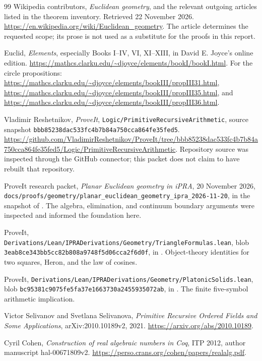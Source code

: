 \begin{thebibliography}{99}
 Wikipedia contributors, \emph{Euclidean geometry}, and the
relevant outgoing articles listed in the theorem inventory. Retrieved
22 November 2026. \url{https://en.wikipedia.org/wiki/Euclidean_geometry}.
The article determines the requested scope; its prose is not used as a
substitute for the proofs in this report.

 Euclid, \emph{Elements}, especially Books I--IV, VI,
XI--XIII, in David E. Joyce's online edition.
\url{https://mathcs.clarku.edu/~djoyce/elements/bookI/bookI.html}.
For the circle propositions:
\url{https://mathcs.clarku.edu/~djoyce/elements/bookIII/propIII31.html},
\url{https://mathcs.clarku.edu/~djoyce/elements/bookIII/propIII35.html}, and
\url{https://mathcs.clarku.edu/~djoyce/elements/bookIII/propIII36.html}.

 Vladimir Reshetnikov, \emph{ProveIt},
\texttt{Logic/PrimitiveRecursiveArithmetic}, source snapshot
\texttt{bbb85238dac533fc4b7b84a750cca864fe35fed5}.
\url{https://github.com/VladimirReshetnikov/ProveIt/tree/bbb85238dac533fc4b7b84a750cca864fe35fed5/Logic/PrimitiveRecursiveArithmetic}.
Repository source was inspected through the GitHub connector; this packet
does not claim to have rebuilt that repository.

 ProveIt research packet,
\emph{Planar Euclidean geometry in iPRA}, 20 November 2026,
\texttt{docs/proofs/geometry/planar\_euclidean\_geometry\_ipra\_2026-11-20},
in the snapshot of \cite{proveit}. The algebra, elimination, and continuum
boundary arguments were inspected and informed the foundation here.

 ProveIt,
\nolinkurl{Derivations/Lean/IPRADerivations/Geometry/TriangleFormulas.lean},
blob \texttt{3eab8ce343bb5cc82b808a9748f5d06cca2f6d0f},
in \cite{proveit}. Object-theory identities for two squares, Heron, and
the law of cosines.

 ProveIt,
\nolinkurl{Derivations/Lean/IPRADerivations/Geometry/PlatonicSolids.lean},
blob \texttt{bc95381c9075fe5fa37e1663730a2455935072ab},
in \cite{proveit}. The finite five-symbol arithmetic implication.

 Victor Selivanov and Svetlana Selivanova,
\emph{Primitive Recursive Ordered Fields and Some Applications},
arXiv:2010.10189v2, 2021.
\url{https://arxiv.org/abs/2010.10189}.

 Cyril Cohen,
\emph{Construction of real algebraic numbers in Coq}, ITP 2012,
author manuscript hal-00671809v2.
\url{https://perso.crans.org/cohen/papers/realalg.pdf}.


\end{thebibliography}

